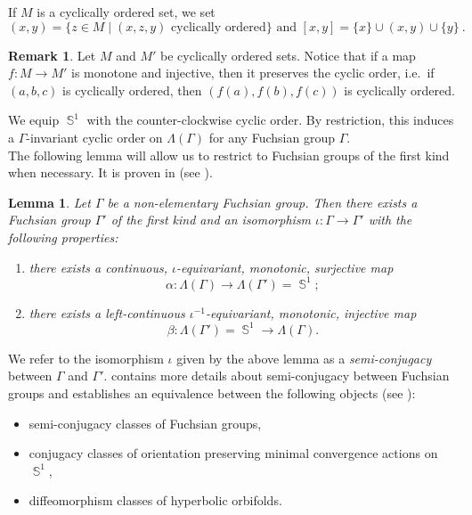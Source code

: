 \documentclass{amsart}
\theoremstyle{plain}
\newtheorem{lemma}[proposition]{Lemma}
\theoremstyle{definition}
\newtheorem{remark}[proposition]{Remark}
\DeclareMathOperator{\Sb}{\mathbb{S}}
\newcommand{\1}{\mathbf{1}}
\begin{document}
If $M$ is a cyclically ordered set, we set 
\[(x,y) = \{z\in M \mid (x,z,y) \textrm{ cyclically ordered}\} \textrm{ and } [x,y] = \{x\} \cup (x,y) \cup \{y\}~.\]

\begin{remark}
Let $M$ and $M'$ be cyclically ordered sets. Notice that if a map $f:M\to M'$ is monotone and injective, then it preserves the cyclic order, i.e.\ if $(a,b,c)$ is cyclically ordered, then $(f(a),f(b),f(c))$ is cyclically ordered.
\end{remark}

We equip $\Sb^1$ with the counter-clockwise cyclic order. By restriction, this induces a $\Gamma$-invariant cyclic order on $\Lambda(\Gamma)$ for any Fuchsian group $\Gamma$. \\


The following lemma will allow us to restrict to Fuchsian groups of the first kind when necessary. It is proven in  (see ).

\begin{lemma}\label{Fuchsian groups lemma}
    Let $\Gamma$ be a non-elementary Fuchsian group. Then there exists a Fuchsian group $\Gamma'$ of the first kind and an isomorphism $\iota\colon \Gamma \to \Gamma'$ with the following properties:
        \begin{enumerate}
            \item there exists a continuous, $\iota$-equivariant, monotonic, surjective map \[\alpha\colon\Lambda(\Gamma)\to  \Lambda(\Gamma') = \Sb^1;\]
            \item there exists a left-continuous $\iota^{-1}$-equivariant, monotonic, injective map \[\beta: \Lambda(\Gamma') = \Sb^1 \to \Lambda(\Gamma).\] 
        \end{enumerate}
\end{lemma}

We refer to the isomorphism $\iota$ given by the above lemma as a \emph{semi-conjugacy} between $\Gamma$ and $\Gamma'$.  contains more details about semi-conjugacy between Fuchsian groups and establishes an equivalence between the following objects (see ):
\begin{itemize}
    \item semi-conjugacy classes of Fuchsian groups,
    \item conjugacy classes of  orientation preserving minimal convergence actions on~$\Sb^1$,
    \item diffeomorphism classes of hyperbolic orbifolds.
\end{itemize}
\end{document}
